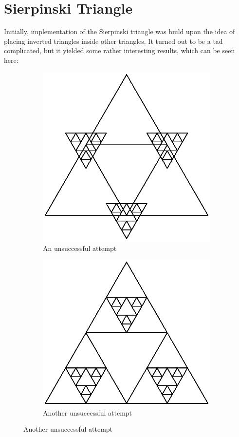 \documentclass[titlepage]{article}
\begin{document}
\section{Sierpinski Triangle}
Initially, implementation of the Sierpinski triangle was build upon the idea of placing inverted triangles inside other triangles. It turned out to be a tad complicated, but it yielded some rather interesting results, which can be seen here:
\begin{figure}[H]
  \centering
  \begin{subfigure}[b]{0.4\textwidth}
    \includegraphics[width=\textwidth]{wrongtriangle}
    \caption{An unsuccessful attempt}
  \end{subfigure}
  \begin{subfigure}[b]{0.5\textwidth}
    \includegraphics[width=\textwidth]{wrongtriangle2}
    \caption{Another unsuccessful attempt}
  \end{subfigure}
\end{figure}
\end{document}
